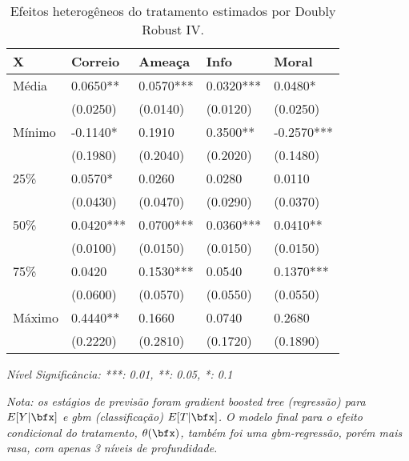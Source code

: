 \begin{table}
\centering
\caption{Efeitos heterogêneos do tratamento estimados por Doubly Robust IV.}
\label{tab:dml-summary}
\begin{threeparttable}
\begin{tabular}{lllll}
\toprule\toprule
    X &    Correio &     Ameaça &       Info &       Moral \\
\midrule
 Média &   0.0650** &  0.0570*** &  0.0320*** &     0.0480* \\
  &   (0.0250) &   (0.0140) &   (0.0120) &    (0.0250) \\
  Mínimo &   -0.1140* &     0.1910 &   0.3500** &  -0.2570*** \\
   &   (0.1980) &   (0.2040) &   (0.2020) &    (0.1480) \\
  25\% &    0.0570* &     0.0260 &     0.0280 &      0.0110 \\
   &   (0.0430) &   (0.0470) &   (0.0290) &    (0.0370) \\
  50\% &  0.0420*** &  0.0700*** &  0.0360*** &    0.0410** \\
   &   (0.0100) &   (0.0150) &   (0.0150) &    (0.0150) \\
  75\% &     0.0420 &  0.1530*** &     0.0540 &   0.1370*** \\
   &   (0.0600) &   (0.0570) &   (0.0550) &    (0.0550) \\
  Máximo &   0.4440** &     0.1660 &     0.0740 &      0.2680 \\
   &   (0.2220) &   (0.2810) &   (0.1720) &    (0.1890) \\
\bottomrule\bottomrule
\end{tabular}
\begin{tablenotes}
\item \emph{Nível Significância: ***: 0.01, **: 0.05, *: 0.1}\\
\item \emph{Nota: os estágios de previsão foram gradient boosted tree (regressão) para $E[Y|\bfx]$ e gbm (classificação) $E[T|\bfx]$. O modelo final para o efeito condicional do tratamento, $\theta(\bfx)$, também foi uma gbm-regressão, porém mais rasa, com apenas 3 níveis de profundidade.}
\end{tablenotes}
\end{threeparttable}
\end{table}
